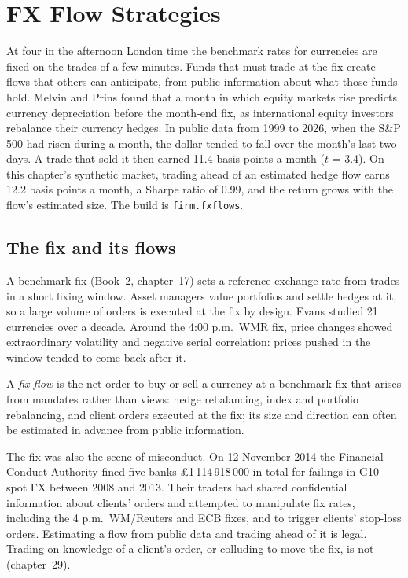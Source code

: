 \chapter{FX Flow Strategies}\label{ch:s2:fx-flow-strategies}

At four in the afternoon London time the benchmark rates for currencies are fixed on the trades of a few minutes. Funds that must trade at the fix
create flows that others can anticipate, from public information about what those funds hold. Melvin and Prins found that a month in which equity
markets rise predicts currency depreciation before the month-end fix, as international equity investors rebalance their currency hedges. In public
data from 1999 to 2026, when the S\&P 500 had risen during a month, the dollar tended to fall over the month's last two days. A trade that sold it then
earned 11.4 basis points a month ($t$ = 3.4). On this chapter's synthetic market, trading ahead of an estimated hedge flow earns 12.2 basis points a
month, a Sharpe ratio of 0.99, and the return grows with the flow's estimated size. The build is \texttt{firm.fxflows}.

\section{The fix and its flows}

A benchmark fix (Book~2, chapter~17) sets a reference exchange rate from trades in a short fixing window. Asset managers value portfolios and settle
hedges at it, so a large volume of orders is executed at the fix by design. Evans studied 21 currencies over a decade. Around the 4:00 p.m.\ WMR fix,
price changes showed extraordinary volatility and negative serial correlation: prices pushed in the window tended to come back after it.

\begin{definition}\label{def:s2:fx-flow-strategies:flow}
A \emph{fix flow} is the net order to buy or sell a currency at a benchmark fix that arises from mandates rather than views: hedge
rebalancing, index and portfolio rebalancing, and client orders executed at the fix; its size and direction can often be estimated in advance from
public information.
\end{definition}

The fix was also the scene of misconduct. On 12 November 2014 the Financial Conduct Authority fined five banks \pounds1\,114\,918\,000 in total for
failings in G10 spot FX between 2008 and 2013. Their traders had shared confidential information about clients' orders and attempted to manipulate
fix rates, including the 4 p.m.\ WM/Reuters and ECB fixes, and to trigger clients' stop-loss orders. Estimating a flow from public data and trading
ahead of it is legal. Trading on knowledge of a client's order, or colluding to move the fix, is not (chapter~29).

